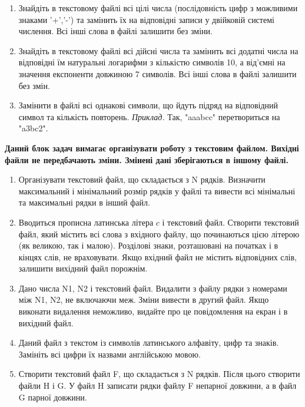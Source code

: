 \documentclass[a5paper,titlepage,openany,twoside,
]
{book_unv}%
\begin{document}
\begin{enumerate}
\begin{enumerate}
\item
 Знайдіть в текстовому файлі всі цілі числа (послідовність цифр з можливими знаками '+','-') 
та замінить їх на відповідні записи у двійковій системі числення. 
Всі інші слова в файлі залишити без зміни.

\item
 Знайдіть в текстовому файлі всі дійсні числа та замінить всі додатні числа на відповідні їм
натуральні логарифми з кількістю символів 10, а від'ємні на значення експоненти довжиною 7
символів. Всі інші слова в файлі залишити без змін.

\item
Замінити в файлі всі однакові символи, що йдуть підряд на відповідний символ та кількість повторень.
\emph{Приклад.} Так, "aaabcc" перетвориться на "a3bc2".

\end{enumerate}

\textbf{Даний блок задач вимагає організувати роботу з текстовим файлом.
 Вихідні файли не передбачають зміни. Змінені дані зберігаються в іншому файлі.}

\begin{enumerate}
\def\labelenumi{\arabic{enumi})}
\setcounter{enumi}{17}

\item
  Організувати текстовий файл, що складається з N рядків. Визначити
  максимальний і мінімальний розмір рядків у файлі та вивести всі мінімальні та
максимальні рядки в інший файл.

\item
  Вводиться прописна латинська літера $c$ і текстовий файл. Створити
  текстовий файл, який містить всі слова з вхідного файлу, що
  починаються цією літерою (як великою, так і малою). Розділові знаки,
  розташовані на початках і в кінцях слів, не враховувати. Якщо вхідний
  файл не містить відповідних слів, залишити вихідний файл порожнім.

\item
  Дано числа N1, N2 і текстовий файл. Видалити з файлу рядки з номерами
  між N1, N2, не включаючи меж. Зміни вивести в другий файл. Якщо
  виконати видалення неможливо, видайте про це повідомлення на екран і в
  вихідний файл.
\item
  Даний файл з текстом із символів латинського алфавіту, цифр та знаків.
  Замініть всі цифри їх назвами англійською мовою.
\item
  Створити текстовий файл F, що складається з N рядків. Після цього
  створити файли H і G. У файл H записати рядки файлу F непарної
  довжини, а в файл G парної довжини.


\end{enumerate}
\end{enumerate}
\end{document}
